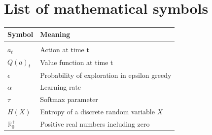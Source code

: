 \documentclass[12pt,a4paper,bibliography=totocnumbered,listof=totocnumbered]{scrartcl}
\begin{document}
\setcounter{page}{1}


	\tableofcontents


\pagebreak


	\listoffigures
	
	
\pagebreak


	\listoftables
	

\pagebreak

\renewcommand{\lstlistlistingname}{List of Listings}
{\lstlistoflistings}
\pagebreak


\renewcommand{\arraystretch}{1.5}	
\section{List of mathematical symbols}

\begin{tabular}{p{6cm}p{9cm}}
\textbf{Symbol} 		& 		\textbf{Meaning} \\
\midrule
\vspace{0.3cm} & \vspace{0.3cm} 			\\
$a_t$				  & Action at time t			\\
$Q(a)_t$	& Value function at time t \\
$\epsilon$			& Probability of exploration in epsilon greedy \\
$\alpha$ & Learning rate \\ 
$\tau$ & Softmax parameter \\
$H(X) $ &  Entropy of a  discrete random variable $X$ \\ 
$ \mathbb{R}_0^+$ & Positive real numbers including zero 
\end{tabular}
\end{document}
